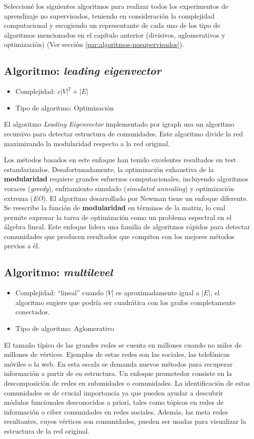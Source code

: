 Seleccioné los siguientes algoritmos para realizar todos los experimentos de aprendizaje no supervisados, teniendo en consideración la complejidad computacional y escogiendo un representante de cada uno de los tipo de algoritmos mencionados en el capítulo anterior (divisivos, aglomerativos y optimización) (Ver sección \ref{par:algoritmos-nosupervisados}).

\subsection{Algoritmo: \textit{leading eigenvector}}\cite{Newman2006FindingMatrices.} 
\begin{itemize}
\item Complejidad: $c|V|^2 + |E|$
\item Tipo de algoritmo: Optimización
\end{itemize} 
El algoritmo \textit{Leading Eigenvector} implementado por igraph usa un algoritmo recursivo para detectar estructura de comunidades. Este algoritmo divide la red maximizando la modularidad respecto a la red original. 
 
Los métodos basados en este enfoque han tenido excelentes resultados en test estandarizados. Desafortunadamente, la optimización exhaustiva de la \textbf{modularidad} requiere grandes esfuerzos computacionales, incluyendo algoritmos voraces (\textit{greedy}), enfriamiento simulado (\textit{simulated annealing}) y optimización extrema (\textit{EO}). El algoritmo desarrollado por Newman tiene un enfoque diferente. Se reescribe la función de \textbf{modularidad} en términos de la matriz, lo cual permite expresar la tarea de optimización como un problema espectral en el álgebra lineal. Este enfoque lidera una familia de algoritmos rápidos para detectar comunidades que producen resultados que compiten con los mejores métodos previos a él.
 
\subsection{Algoritmo: \textit{multilevel}}\cite{Blondel2008FastNetworks} 
\begin{itemize}
\item Complejidad: ``lineal'' cuando  $|V|$ es aproximadamente igual a $|E|$, el algoritmo sugiere que podría ser cuadrática con los grafos completamente conectados.
\item Tipo de algoritmo: Aglomerativo
\end{itemize}
El tamaño típico de las grandes redes se cuenta en millones cuando no miles de millones de vértices. Ejemplos de estas redes son las sociales, las telefónicas móviles o la web. En esta escala se demanda nuevos métodos para recuperar información a partir de su estructura. Un enfoque prometedor consiste en la descomposición de redes en subunidades o comunidades. La identificación de estas comunidades es de crucial importancia ya que pueden ayudar a descubrir módulos funcionales desconocidos a priori, tales como tópicos en redes de información o ciber comunidades en redes sociales. Además, las meta redes resultantes, cuyos vértices son comunidades, pueden ser usadas para visualizar la estructura de la red original.
 
